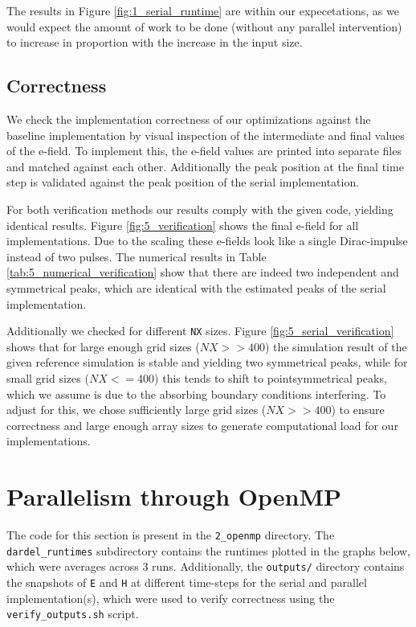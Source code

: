 \documentclass[a4paper,10pt]{article}
\begin{document}
The results in Figure \ref{fig:1_serial_runtime} are within our expecetations, as we would expect the amount of work to be done (without any parallel intervention) to increase in proportion with the increase in the input size.  

\subsection{Correctness}
We check the implementation correctness of our optimizations against the baseline implementation by visual inspection of the intermediate and final values of the e-field.
To implement this, the e-field values are printed into separate files and matched against each other.
Additionally the peak position at the final time step is validated against the peak position of the serial implementation. 

For both verification methods our results comply with the given code, yielding identical results. Figure \ref{fig:5_verification} shows the final e-field for all implementations. 
Due to the scaling these e-fields look like a single Dirac-impulse instead of two pulses. 
The numerical results in Table \ref{tab:5_numerical_verification} show that there are indeed two independent and symmetrical peaks, which are identical with the estimated peaks of the serial implementation.

Additionally we checked for different \verb|NX| sizes. Figure \ref{fig:5_serial_verification} shows that for large enough grid sizes ($NX >> 400$) the simulation result of the given reference simulation is stable and yielding two symmetrical peaks, while for small grid sizes ($NX <= 400$) this tends to shift to pointsymmetrical peaks, which we assume is due to the absorbing boundary conditions interfering.
To adjust for this, we chose sufficiently large grid sizes ($NX >> 400$) to ensure correctness and large enough array sizes to generate computational load for our implementations.

\section{Parallelism through OpenMP}
The code for this section is present in the \verb|2_openmp| directory.
The \verb|dardel_runtimes| subdirectory contains the runtimes plotted in the graphs below, which were averages across 3 runs.
Additionally, the \verb|outputs/| directory contains the snapshots of \verb|E| and \verb|H| at different time-steps for the serial and parallel implementation(s), which were used to verify correctness using the \verb|verify_outputs.sh| script.
\end{document}
